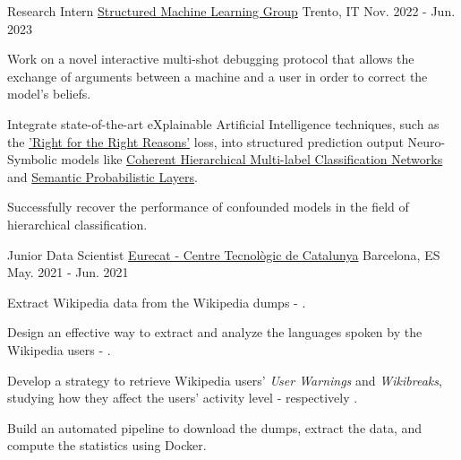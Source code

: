 \documentclass[11pt, a4paper]{awesome-cv}
\begin{document}
\begin{cventries}
  \cventry
    {Research Intern} %
    {\href{https://sml.disi.unitn.it/}{Structured Machine Learning Group}} %
    {Trento, IT} %
    {Nov. 2022 - Jun. 2023} %
    {
      \begin{cvitems} %
        \item {Work on a novel interactive multi-shot debugging protocol that allows the exchange of arguments between a machine and a user in order to correct the model's beliefs.}
        \item {Integrate state-of-the-art eXplainable Artificial Intelligence techniques, such as the \href{https://arxiv.org/pdf/1703.03717.pdf}{'Right for the Right Reasons'} loss, into structured prediction output Neuro-Symbolic models like \href{https://proceedings.neurips.cc//paper/2020/file/6dd4e10e3296fa63738371ec0d5df818-Paper.pdf}{Coherent Hierarchical Multi-label Classification Networks} and \href{https://proceedings.neurips.cc/paper_files/paper/2022/file/c182ec594f38926b7fcb827635b9a8f4-Paper-Conference.pdf}{Semantic Probabilistic Layers}.}
        \item {Successfully recover the performance of confounded models in the field of hierarchical classification.}
      \end{cvitems}
    }


  \cventry
    {Junior Data Scientist} %
    {\href{https://eurecat.org/en/}{Eurecat - Centre Tecnològic de Catalunya}} %
    {Barcelona, ES} %
    {May. 2021 - Jun. 2021} %
    {
      \begin{cvitems} %
        \item{Extract Wikipedia data from the Wikipedia dumps - .}
        \item {Design an effective way to extract and analyze the languages spoken by the Wikipedia users - .}
        \item{Develop a strategy to retrieve Wikipedia users' \emph{User Warnings} and \emph{Wikibreaks}, studying how they affect the users' activity level - respectively .}
        \item {Build an automated pipeline to download the dumps, extract the data, and compute the statistics using Docker.}
      \end{cvitems}
    }


\end{cventries}
\end{document}
